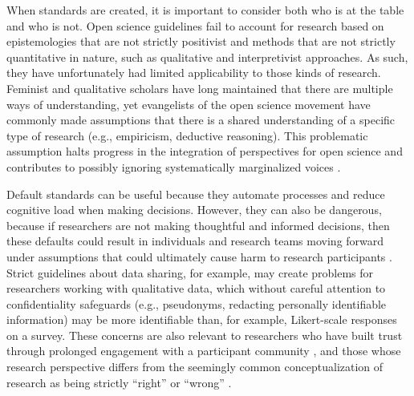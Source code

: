 \documentclass[authordate, meta]{jote-new-article}
\begin{document}
When standards are created, it is important to consider both who is at the table and who is not. Open science guidelines fail to account for research based on epistemologies that are not strictly positivist and methods that are not strictly quantitative in nature, such as qualitative and interpretivist approaches. As such, they have unfortunately had limited applicability to those kinds of research. Feminist and qualitative scholars have long maintained that there are multiple ways of understanding, yet evangelists of the open science movement have commonly made assumptions that there is a shared understanding of a specific type of research (e.g., empiricism, deductive reasoning). This problematic assumption halts progress in the integration of perspectives for open science and contributes to possibly ignoring systematically marginalized voices \parencites[see][]{Bennett2022}.



Default standards can be useful because they automate processes and reduce cognitive load when making decisions. However, they can also be dangerous, because if researchers are not making thoughtful and informed decisions, then these defaults could result in individuals and research teams moving forward under assumptions that could ultimately cause harm to research participants \parencites{Sakaluk2021}{Steltenpohl2021}. Strict guidelines about data sharing, for example, may create problems for researchers working with qualitative data, which without careful attention to confidentiality safeguards (e.g., pseudonyms, redacting personally identifiable information) may be more identifiable than, for example, Likert-scale responses on a survey. These concerns are also relevant to researchers who have built trust through prolonged engagement with a participant community \parencites{Ross2018}, and those whose research perspective differs from the seemingly common conceptualization of research as being strictly “right” or “wrong” \parencites{Lash2015}.
\end{document}
